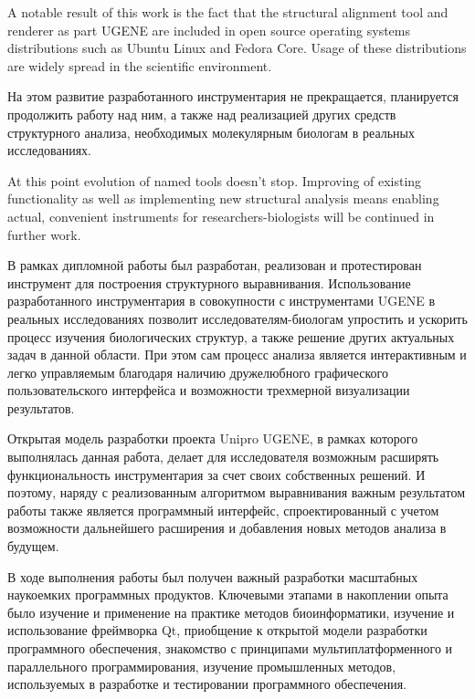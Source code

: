 \documentclass[a4paper, 12pt, titlepage, utf8]{extarticle}
\begin{document}
\begin{original}
\begin{original}
A notable result of this work is the fact that the structural alignment tool and
renderer as part UGENE are included in open source operating systems
distributions such as Ubuntu Linux and Fedora Core. Usage of these distributions
are widely spread in the scientific environment.

\begin{original}
На этом развитие разработанного инструментария не прекращается, планируется
продолжить работу над ним, а также над реализацией других средств структурного
анализа, необходимых молекулярным биологам в реальных исследованиях.
\end{original}

At this point evolution of named tools doesn't stop. Improving of existing
functionality as well as implementing new structural analysis means enabling
actual, convenient instruments for researchers-biologists will be continued in
further work.


\begin{original}
В рамках дипломной работы был разработан, реализован и протестирован инструмент
для построения структурного выравнивания. Использование разработанного
инструментария в совокупности с инструментами UGENE в реальных исследованиях
позволит исследователям-биологам упростить и ускорить процесс изучения
биологических структур, а также решение других актуальных задач в данной
области. При этом сам процесс анализа является интерактивным и легко управляемым
благодаря наличию дружелюбного графического пользовательского интерфейса и
возможности трехмерной визуализации результатов.

Открытая модель разработки проекта Unipro UGENE, в рамках которого выполнялась
данная работа, делает для исследователя возможным расширять функциональность
инструментария за счет своих собственных решений. И поэтому, наряду с
реализованным алгоритмом выравнивания важным результатом работы также является
программный интерфейс, спроектированный с учетом возможности дальнейшего
расширения и добавления новых методов анализа в будущем.

В ходе выполнения работы был получен важный разработки масштабных наукоемких
программных продуктов. Ключевыми этапами в накоплении опыта было изучение и
применение на практике методов биоинформатики, изучение и использование
фреймворка Qt, приобщение к открытой модели разработки программного обеспечения,
знакомство с принципами мультиплатформенного и параллельного программирования,
изучение промышленных методов, используемых в разработке и тестировании
программного обеспечения.


\end{original}
\end{original}
\end{original}
\end{document}
